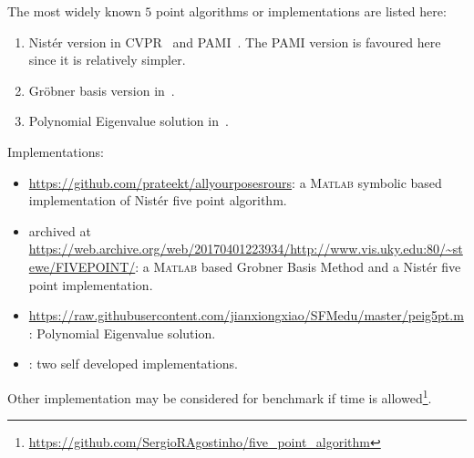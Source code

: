 The most widely known $5$ point algorithms or implementations are listed here:
\begin{enumerate}
\item Nist\'er version in CVPR~\cite{nister2003efficient} and PAMI~\cite{nister2004efficient}. The PAMI version is favoured here since it is relatively simpler.
\item Gr\"obner basis version in~\cite{stewenius2006recent}. 
\item Polynomial Eigenvalue solution in~\cite{kukelovapolynomial}.
\end{enumerate}
Implementations:
\begin{itemize}
\item \url{https://github.com/prateekt/allyourposesrours}: a \textsc{Matlab} symbolic based implementation of Nist\'er five point algorithm.
\item archived at \url{https://web.archive.org/web/20170401223934/http://www.vis.uky.edu:80/~stewe/FIVEPOINT/}: a \textsc{Matlab} based Grobner Basis Method and a Nist\'er five point implementation.
\item \url{https://raw.githubusercontent.com/jianxiongxiao/SFMedu/master/peig5pt.m}: Polynomial Eigenvalue solution.
\item: two self developed implementations.
\end{itemize}
Other implementation may be considered for benchmark if time is allowed\footnote{\url{https://github.com/SergioRAgostinho/five_point_algorithm}}.

